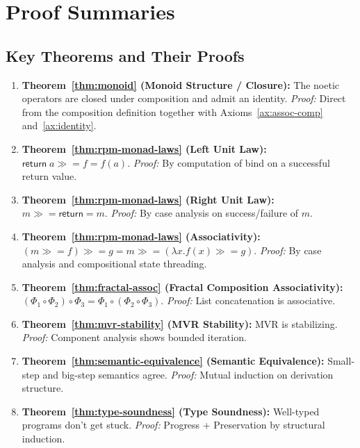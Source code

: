 \documentclass[11pt,twoside,openright]{book}
\theoremstyle{definition}
\theoremstyle{plain}
\theoremstyle{remark}
\newcommand{\rpmret}{\mathsf{return}}
\newcommand{\rpmbind}{\mathbin{\gg\!=}}
\newcommand{\Frac}{\Phi}
\begin{document}
\chapter{Proof Summaries}
\label{app:proofs}

\section{Key Theorems and Their Proofs}

\begin{enumerate}
\item \textbf{Theorem~\ref{thm:monoid} (Monoid Structure / Closure):} The noetic operators are closed under composition and admit an identity. \textit{Proof:} Direct from the composition definition together with Axioms~\ref{ax:assoc-comp} and~\ref{ax:identity}. 

\item \textbf{Theorem~\ref{thm:rpm-monad-laws} (Left Unit Law):} $\rpmret\; a \rpmbind f = f(a)$. \textit{Proof:} By computation of bind on a successful return value.

\item \textbf{Theorem~\ref{thm:rpm-monad-laws} (Right Unit Law):} $m \rpmbind \rpmret = m$. \textit{Proof:} By case analysis on success/failure of $m$.

\item \textbf{Theorem~\ref{thm:rpm-monad-laws} (Associativity):} $(m \rpmbind f) \rpmbind g = m \rpmbind (\lambda x. f(x) \rpmbind g)$. \textit{Proof:} By case analysis and compositional state threading.

\item \textbf{Theorem~\ref{thm:fractal-assoc} (Fractal Composition Associativity):} $(\Frac_1 \circ \Frac_2) \circ \Frac_3 = \Frac_1 \circ (\Frac_2 \circ \Frac_3)$. \textit{Proof:} List concatenation is associative.

\item \textbf{Theorem~\ref{thm:mvr-stability} (MVR Stability):} MVR is stabilizing. \textit{Proof:} Component analysis shows bounded iteration.

\item \textbf{Theorem~\ref{thm:semantic-equivalence} (Semantic Equivalence):} Small-step and big-step semantics agree. \textit{Proof:} Mutual induction on derivation structure.

\item \textbf{Theorem~\ref{thm:type-soundness} (Type Soundness):} Well-typed programs don't get stuck. \textit{Proof:} Progress + Preservation by structural induction.
\end{enumerate}
\end{document}
